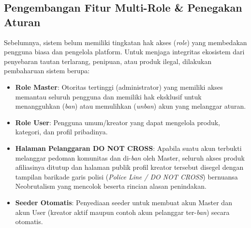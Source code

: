 \documentclass[12pt,a4paper]{article}
\begin{document}
\subsection{Pengembangan Fitur Multi-Role \& Penegakan Aturan}
Sebelumnya, sistem belum memiliki tingkatan hak akses (\textit{role}) yang membedakan pengguna biasa dan pengelola platform. Untuk menjaga integritas ekosistem dari penyebaran tautan terlarang, penipuan, atau produk ilegal, dilakukan pembaharuan sistem berupa:
\begin{itemize}
    \item \textbf{Role Master}: Otoritas tertinggi (administrator) yang memiliki akses memantau seluruh pengguna dan memiliki hak eksklusif untuk menangguhkan (\textit{ban}) atau memulihkan (\textit{unban}) akun yang melanggar aturan.
    \item \textbf{Role User}: Pengguna umum/kreator yang dapat mengelola produk, kategori, dan profil pribadinya.
    \item \textbf{Halaman Pelanggaran DO NOT CROSS}: Apabila suatu akun terbukti melanggar pedoman komunitas dan di-\textit{ban} oleh Master, seluruh akses produk afiliasinya ditutup dan halaman publik profil kreator tersebut disegel dengan tampilan barikade garis polisi (\textit{Police Line / DO NOT CROSS}) bernuansa Neobrutalism yang mencolok beserta rincian alasan penindakan.
    \item \textbf{Seeder Otomatis}: Penyediaan seeder untuk membuat akun Master dan akun User (kreator aktif maupun contoh akun pelanggar ter-\textit{ban}) secara otomatis.
\end{itemize}
\end{document}
